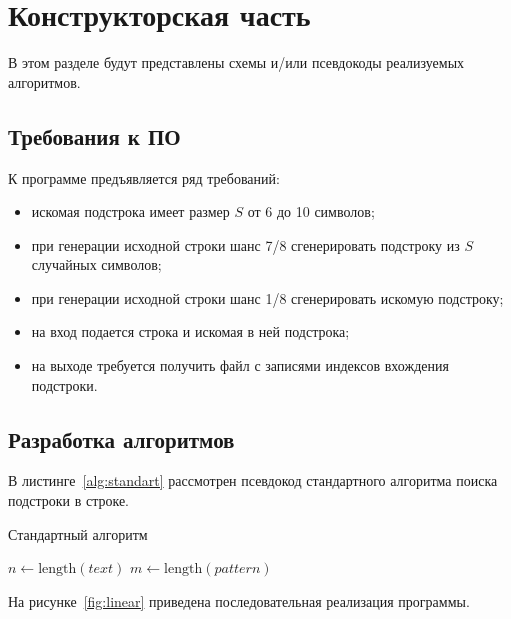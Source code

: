 \section{Конструкторская часть}

В этом разделе будут представлены схемы и/или псевдокоды реализуемых алгоритмов.

\subsection{Требования к ПО}
К программе предъявляется ряд требований:
\begin{itemize}[]
	\item искомая подстрока имеет размер $S$ от 6 до 10 символов;
	\item при генерации исходной строки шанс 7/8 сгенерировать подстроку из $S$ случайных символов;
	\item при генерации исходной строки шанс 1/8 сгенерировать искомую подстроку;
	\item на вход подается строка и искомая в ней подстрока;
	\item на выходе требуется получить файл с записями индексов вхождения подстроки.
\end{itemize}

\newpage
\subsection{Разработка алгоритмов}

В листинге~\ref{alg:standart} рассмотрен псевдокод стандартного алгоритма поиска подстроки в строке.

\begin{algorithm}[H]
	\caption{Стандартный алгоритм}
	\label{alg:standart}
	\SetAlgoLined
	$n \gets \text{length}(text)$\;
	$m \gets \text{length}(pattern)$\;
	\;
\end{algorithm}

\newpage

На рисунке~\ref{fig:linear} приведена последовательная реализация программы.

